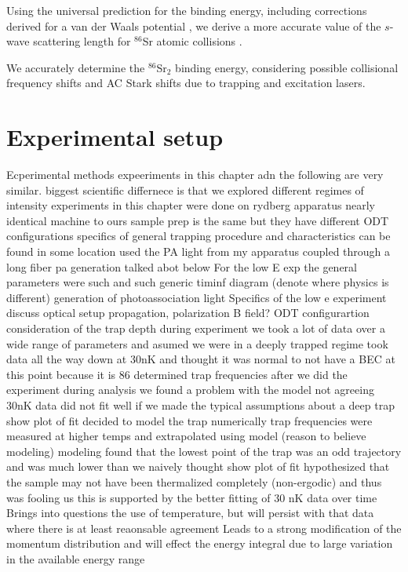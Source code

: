 Using the universal prediction for the binding energy, including corrections derived for a van der Waals potential \cite{gfl93,gao01,gao04}, we derive a more accurate value of the $s$-wave scattering length for $^{86}$Sr atomic collisions \cite{skt10,mmp08}.

We accurately determine the $^{86}$Sr$_2$ binding energy, considering possible collisional frequency shifts and AC Stark shifts due to trapping and excitation lasers. 

\section{Experimental setup}
\label{sec:lowE_setup}

Ecperimental methods
	expeeriments in this chapter adn the following are very similar. biggest scientific differnece is that we explored different regimes of intensity
	experiments in this chapter were done on rydberg apparatus
		nearly identical machine to ours 
			sample prep is the same but they have different ODT configurations
			specifics of general trapping procedure and characteristics can be found in some location
		used the PA light from my apparatus coupled through a long fiber
			pa generation talked abot below
		For the low E exp the general parameters were such and such
	generic timinf diagram (denote where physics is different)
generation of photoassociation light
Specifics of the low e experiment
	discuss optical setup
		propagation, polarization
	B field?
	ODT configurartion
		consideration of the trap depth
			during experiment we took a lot of data over a wide range of parameters and asumed we were in a deeply trapped regime
				took data all the way down at 30nK and thought it was normal to not have a BEC at this point because it is 86
			determined trap frequencies after we did the experiment
			during analysis we found a problem with the model not agreeing
				30nK data did not fit well if we made the typical assumptions about a deep trap
				show plot of fit
			decided to model the trap numerically
				trap frequencies were measured at higher temps and extrapolated using model (reason to believe modeling)
			modeling found that the lowest point of the trap was an odd trajectory and was much lower than we naively thought
				show plot of fit
				hypothesized that the sample may not have been thermalized completely (non-ergodic) and thus was fooling us
				this is supported by the better fitting of 30 nK data over time
			Brings into questions the use of temperature, but will persist with that data where there is at least reaonsable agreement
			Leads to a strong modification of the momentum distribution and will effect the energy integral due to large variation in the available energy range

